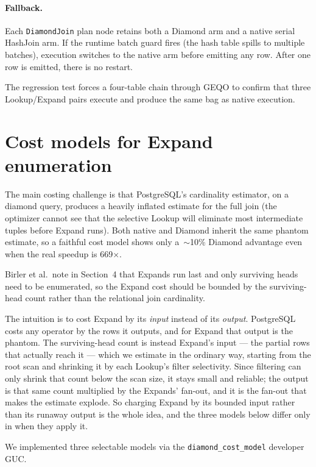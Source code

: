 \documentclass[10pt,twocolumn]{article}
\newcommand{\code}[1]{{\small\texttt{#1}}}
\begin{document}
\paragraph{Fallback.}
Each \code{DiamondJoin} plan node retains both a Diamond arm and a native
serial HashJoin arm. If the runtime batch guard fires (the hash table spills to
multiple batches), execution switches to the native arm before emitting any row.
After one row is emitted, there is no restart.

The regression test forces a four-table chain through GEQO to confirm that
three Lookup/Expand pairs execute and produce the same bag as native execution.

\section{Cost models for Expand enumeration}

The main costing challenge is that PostgreSQL's cardinality estimator, on a
diamond query, produces a heavily inflated estimate for the full join (the
optimizer cannot see that the selective Lookup will eliminate most intermediate
tuples before Expand runs). Both native and Diamond inherit the same phantom
estimate, so a faithful cost model shows only a~$\sim$10\% Diamond advantage
even when the real speedup is 669$\times$.

Birler et al.\ note in Section~4 that Expands run last and only surviving heads
need to be enumerated, so the Expand cost should be bounded by the
surviving-head count rather than the relational join cardinality.

The intuition is to cost Expand by its \emph{input} instead of its
\emph{output}. PostgreSQL costs any operator by the rows it outputs, and for
Expand that output is the phantom. The surviving-head count is instead Expand's
input --- the partial rows that actually reach it --- which we estimate in the
ordinary way, starting from the root scan and shrinking it by each Lookup's
filter selectivity. Since filtering can only shrink that count below the scan
size, it stays small and reliable; the output is that same count multiplied by
the Expands' fan-out, and it is the fan-out that makes the estimate explode. So
charging Expand by its bounded input rather than its runaway output is the whole
idea, and the three models below differ only in when they apply it.

We implemented three selectable models via the \code{diamond\_cost\_model}
developer GUC.
\end{document}
